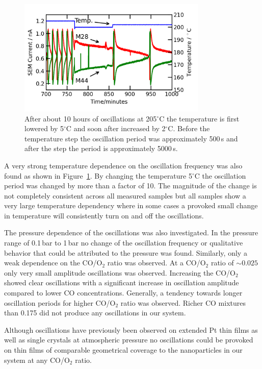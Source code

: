 \documentclass[8.5pt,twoside,twocolumn]{article}
\begin{document}
\begin{figure}[h]
\centering
  \includegraphics[width=9cm]{temperature_dependence.png}
  \caption{After about 10 hours of oscillations at 205$^\circ$C the temperature is first lowered by 5$^\circ$C and soon after increased by 2$^\circ$C. Before the temperature step the oscillation period was approximately 500\,s and after the step the period is approximately 5000\,s.}
  \label{fgr:temperature_dependence}
\end{figure}
A very strong temperature dependence on the oscillation frequency was also found as shown in Figure~\ref{fgr:temperature_dependence}. By changing the temperature 5$^\circ$C the oscillation period was changed by more than a factor of 10. The magnitude of the change is not completely consistent across all measured samples but all samples show a very large temperature dependency where in some cases a provoked small change in temperature will consistently turn on and off the oscillations.

The pressure dependence of the oscillations was also investigated. In the pressure range of 0.1\,bar to 1\,bar no change of the oscillation frequency or qualitative behavior that could be attributed to the pressure was found. Similarly, only a weak dependence on the CO/O$_2$ ratio was observed. At a CO/O$_2$ ratio of $\sim0.025$ only very small amplitude oscillations was observed. Increasing the CO/O$_2$ showed clear oscillations with a significant increase in oscillation amplitude compared to lower CO concentrations. Generally, a tendency towards longer oscillation periods for higher CO/O$_2$ ratio was observed. Richer CO mixtures than 0.175 did not produce any oscillations in our system.

Although oscillations have previously been observed on extended Pt thin films \cite{Singh2010} as well as single crystals\cite{Hendriksen2005} at atmospheric pressure no oscillations could be provoked on thin films of comparable geometrical coverage to the nanoparticles in our system at any CO/O$_2$ ratio.  
\end{document}
